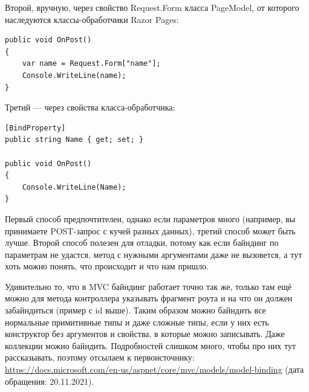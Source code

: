 \documentclass[a5paper]{article}
\begin{document}
Второй, вручную, через свойство Request.Form класса PageModel, от которого наследуются классы-обработчики Razor Pages:  

\begin{verbatim}
public void OnPost()
{
    var name = Request.Form["name"];
    Console.WriteLine(name);
}
\end{verbatim}

Третий --- через свойства класса-обработчика:

\begin{verbatim}
[BindProperty]
public string Name { get; set; }

public void OnPost()
{
    Console.WriteLine(Name);
}
\end{verbatim}

Первый способ предпочтителен, однако если параметров много (например, вы принимаете POST-запрос с кучей разных данных), третий способ может быть лучше. Второй способ полезен для отладки, потому как если байндинг по параметрам не удастся, метод с нужными аргументами даже не вызовется, а тут хоть можно понять, что происходит и что нам пришло.

Удивительно то, что в MVC байндинг работает точно так же, только там ещё можно для метода контроллера указывать фрагмент роута и на что он должен забайндиться (пример с id выше). Таким образом можно байндить все нормальные примитивные типы и даже сложные типы, если у них есть конструктор без аргументов и свойства, в которые можно записывать. Даже коллекции можно байндить. Подробностей слишком много, чтобы про них тут рассказывать, поэтому отсылаем к первоисточнику: \url{https://docs.microsoft.com/en-us/aspnet/core/mvc/models/model-binding} (дата обращения: 20.11.2021).
\end{document}
